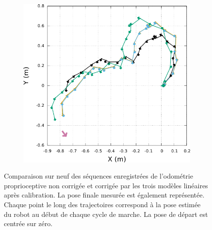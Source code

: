 \begin{figure}[h]
\begin{subfigure}{0.28\paperwidth}
    \end{subfigure}
    \begin{subfigure}{0.28\paperwidth}
        \centering
        \includegraphics[type=pdf,ext=.pdf,read=.pdf,width=1.0\linewidth]{../plot/OdometryCMAES/readsTraj9}
    \end{subfigure}
    \caption{\label{fig:odometry_cmaes_trajs_reads} 
        Comparaison sur neuf des séquences enregistrées de l'odométrie proprioceptive non
        corrigée et corrigée par les trois modèles linéaires après calibration.
        La pose finale mesurée est également représentée.
        Chaque point le long des trajectoires correspond à la pose estimée du robot 
        au début de chaque cycle de marche.
        La pose de départ est centrée sur zéro.
    }
\end{figure}

